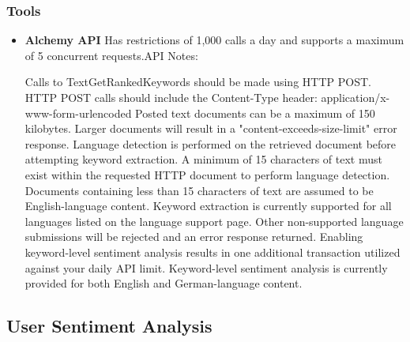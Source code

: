 \subsubsection{Tools}
\begin{itemize}
\item {\bf Alchemy API} Has restrictions of 1,000 calls a day and supports a maximum of 5 concurrent requests.API Notes:

Calls to TextGetRankedKeywords should be made using HTTP POST.
HTTP POST calls should include the Content-Type header: application/x-www-form-urlencoded
Posted text documents can be a maximum of 150 kilobytes. Larger documents will result in a "content-exceeds-size-limit" error response.
Language detection is performed on the retrieved document before attempting keyword extraction. A minimum of 15 characters of text must exist within the requested HTTP document to perform language detection.
Documents containing less than 15 characters of text are assumed to be English-language content.
Keyword extraction is currently supported for all languages listed on the language support page. Other non-supported language submissions will be rejected and an error response returned.
Enabling keyword-level sentiment analysis results in one additional transaction utilized against your daily API limit. Keyword-level sentiment analysis is currently provided for both English and German-language content.
\end{itemize}

\subsection{User Sentiment Analysis}
